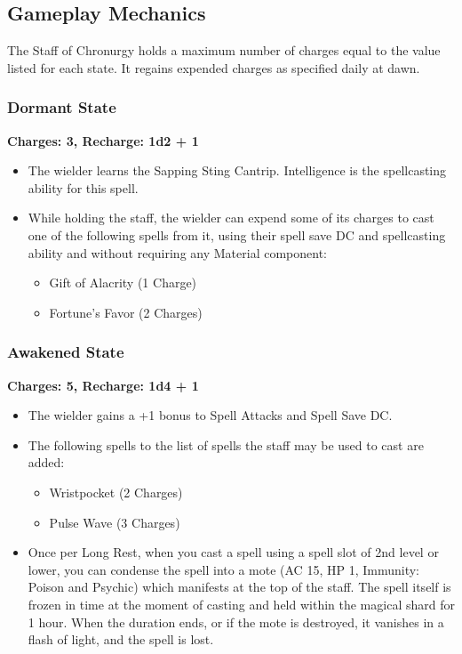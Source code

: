 \subsection*{Gameplay Mechanics}
{\entryfont The Staff of Chronurgy holds a maximum number of charges equal to the value listed for each state. It regains expended charges as specified daily at dawn.
\subsubsection*{Dormant State}
\textbf{Charges: 3, Recharge: 1d2 + 1}
\begin{itemize}
	\item The wielder learns the Sapping Sting Cantrip. Intelligence is the spellcasting ability for this spell.
	\item While holding the staff, the wielder can expend some of its charges to cast one of the following spells from it, using their spell save DC and spellcasting ability and without requiring any Material component:
	\begin{itemize}
		\item Gift of Alacrity (1 Charge)
		\item Fortune's Favor (2 Charges)
	\end{itemize}
\end{itemize}
\subsubsection*{Awakened State}
\textbf{Charges: 5, Recharge: 1d4 + 1}
\begin{itemize}
	\item The wielder gains a +1 bonus to Spell Attacks and Spell Save DC.
	\item The following spells to the list of spells the staff may be used to cast are added:
	\begin{itemize}
		\item Wristpocket (2 Charges)
		\item Pulse Wave (3 Charges)
	\end{itemize}
	\item Once per Long Rest, when you cast a spell using a spell slot of 2nd level or lower, you can condense the spell into a mote (AC 15, HP 1, Immunity: Poison and Psychic) which manifests at the top of the staff. The spell itself is frozen in time at the moment of casting and held within the magical shard for 1 hour. When the duration ends, or if the mote is destroyed, it vanishes in a flash of light, and the spell is lost.
	

\end{itemize}}
